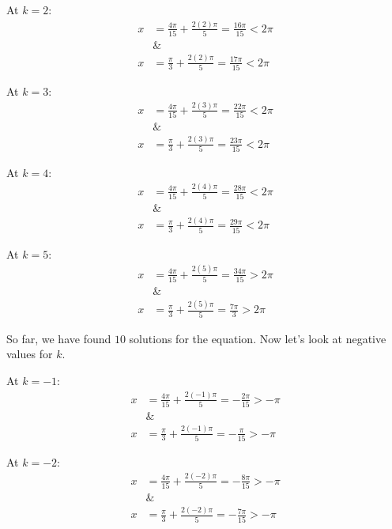 \documentclass[12pt]{article}
\theoremstyle{definition}
\begin{document}
At $k=2$:
\begin{align}
    x & =\frac{4\pi}{15} + \frac{2(2)\pi}{5} = \frac{16\pi}{15} < 2\pi \\
      & \&                                                             \\
    x & =\frac{\pi}{3} + \frac{2(2)\pi}{5} = \frac{17\pi}{15} < 2\pi
\end{align}

At $k=3$:
\begin{align}
    x & =\frac{4\pi}{15} + \frac{2(3)\pi}{5} = \frac{22\pi}{15} < 2\pi \\
      & \&                                                             \\
    x & =\frac{\pi}{3} + \frac{2(3)\pi}{5} = \frac{23\pi}{15} < 2\pi
\end{align}

At $k=4$:
\begin{align}
    x & =\frac{4\pi}{15} + \frac{2(4)\pi}{5} = \frac{28\pi}{15} < 2\pi \\
      & \&                                                             \\
    x & =\frac{\pi}{3} + \frac{2(4)\pi}{5} = \frac{29\pi}{15} < 2\pi
\end{align}

At $k=5$:
\begin{align}
    x & =\frac{4\pi}{15} + \frac{2(5)\pi}{5} = \frac{34\pi}{15} > 2\pi \\
      & \&                                                             \\
    x & =\frac{\pi}{3} + \frac{2(5)\pi}{5} = \frac{7\pi}{3} > 2\pi
\end{align}

So far, we have found $10$ solutions for the equation.
Now let's look at negative values for $k$.

At $k=-1$:
\begin{align}
    x & =\frac{4\pi}{15} + \frac{2(-1)\pi}{5} = -\frac{2\pi}{15} > -\pi \\
      & \&                                                              \\
    x & =\frac{\pi}{3} + \frac{2(-1)\pi}{5} = -\frac{\pi}{15} > -\pi
\end{align}

At $k=-2$:
\begin{align}
    x & =\frac{4\pi}{15} + \frac{2(-2)\pi}{5} = -\frac{8\pi}{15} > -\pi \\
      & \&                                                              \\
    x & =\frac{\pi}{3} + \frac{2(-2)\pi}{5} = -\frac{7\pi}{15} > -\pi
\end{align}
\end{document}
